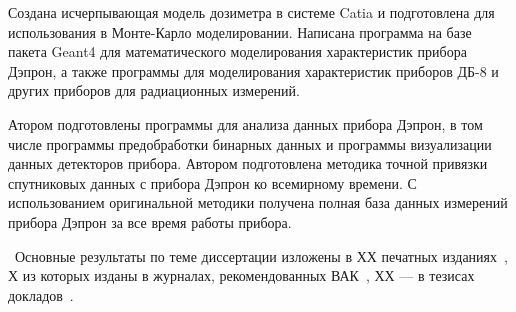 Создана исчерпывающая модель дозиметра в системе Catia и подготовлена для использования в Монте-Карло моделировании. Написана программа на базе пакета Geant4 для математического моделирования характеристик прибора Дэпрон, а также программы для моделирования характеристик приборов ДБ-8 и других приборов для радиационных измерений. 

Атором подготовлены программы для анализа данных прибора Дэпрон, в том числе программы предобработки бинарных данных и программы визуализации данных детекторов прибора. 
Автором подготовлена методика точной привязки спутниковых данных с прибора Дэпрон ко всемирному времени. С использованием оригинальной методики получена полная база данных измерений прибора Дэпрон за все время работы прибора.

\publications\ Основные результаты по теме диссертации изложены в ХХ печатных изданиях~\cite{zolotarev2017numerical51590279,vlasova2017optimization27547274,vlasova2015operational11246447},
Х из которых изданы в журналах, рекомендованных ВАК~\cite{zolotarev2016chislennoe32150868}, 
ХХ --- в тезисах докладов~\cite{zolotarev2016modelirovanie36997161,grafodatsky2016development21020642, amelyushkin2015sozdanie1065732, angelopoulos2010university5851829, angelopoulos2011university1295357}.
